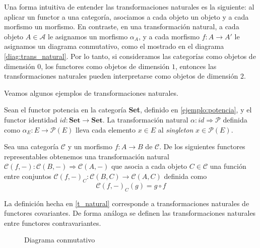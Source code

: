 Una forma intuitiva de entender las transformaciones naturales es la siguiente: al aplicar un functor a una categoría, asociamos a cada objeto un objeto y a cada morfismo un morfismo. En contraste, en una transformación natural, a cada objeto $A \in \mathscr{A}$ le asignamos un morfismo $\alpha_A$, y a cada morfismo $f: A \longrightarrow A'$ le asignamos un diagrama conmutativo, como el mostrado en el diagrama \ref{diag:trans_natural}. Por lo tanto, si consideramos las categorías como objetos de dimensión $0$, los functores como objetos de dimensión $1$, entonces las transformaciones naturales pueden interpretarse como objetos de dimensión $2$.

Veamos algunos ejemplos de transformaciones naturales.

\begin{ejemplo}
    Sean el functor potencia en la categoría \textbf{Set}, definido en \ref{ejemplo:potencia}, y el functor identidad $id: \textbf{Set} \longrightarrow \textbf{Set}$. La transformación natural $\alpha: id \Rightarrow \mathcal{P}$ definida como $\alpha_{E}: E \longrightarrow \mathcal{P}(E)$ lleva cada elemento $x \in E$ al \textit{singleton} ${x} \in \mathcal{P}(E)$.
\end{ejemplo}

\begin{ejemplo}
    Sea una categoría $\mathscr{C}$ y un morfismo $f:A \longrightarrow B$ de $\mathscr{C}$. De los siguientes functores representables obtenemos una transformación natural $\mathscr{C}(f,-) : \mathscr{C}(B,-) \Rightarrow \mathscr{C}(A,-)$  que asocia a cada objeto $C \in \mathscr{C}$ una función entre conjuntos $\mathscr{C}(f,-)_{C}: \mathscr{C}(B,C) \longrightarrow \mathscr{C}(A,C)$ definida como \begin{equation}
        \mathscr{C}(f,-)_{C}(g) = g \circ f
    \end{equation}
\end{ejemplo}

La definición hecha en \ref{t_natural} corresponde a transformaciones naturales de functores covariantes. De forma análoga se definen las transformaciones naturales entre functores contravariantes. 

\begin{figure}[htpb]
    \centering
    \caption{Diagrama conmutativo}
    \label{diag:trans_natural_contra}
\end{figure}

